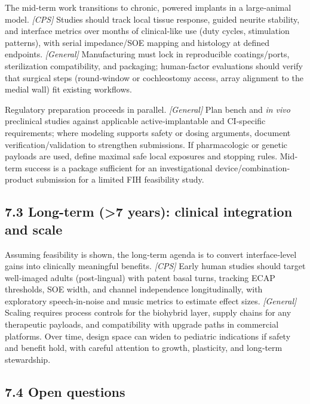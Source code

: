 The mid‐term work transitions to chronic, powered implants in a large‐animal model. \textit{[CPS]} Studies should track local tissue response, guided neurite stability, and interface metrics over months of clinical‐like use (duty cycles, stimulation patterns), with serial impedance/SOE mapping and histology at defined endpoints.\cite{Dalrymple2020, Horne2023} \textit{[General]} Manufacturing must lock in reproducible coatings/ports, sterilization compatibility, and packaging; human‐factor evaluations should verify that surgical steps (round‐window or cochleostomy access, array alignment to the medial wall) fit existing workflows.\cite{Rebscher2008} 

Regulatory preparation proceeds in parallel. \textit{[General]} Plan bench and \emph{in vivo} preclinical studies against applicable active‐implantable and CI‐specific requirements;\cite{ISO14708} where modeling supports safety or dosing arguments, document verification/validation to strengthen submissions.\cite{USFDA2021InSilico} If pharmacologic or genetic payloads are used, define maximal safe local exposures and stopping rules. Mid‐term success is a package sufficient for an investigational device/combination‐product submission for a limited FIH feasibility study.

\subsection*{7.3 Long-term (>7 years): clinical integration and scale}

Assuming feasibility is shown, the long‐term agenda is to convert interface‐level gains into clinically meaningful benefits. \textit{[CPS]} Early human studies should target well‐imaged adults (post‐lingual) with patent basal turns, tracking ECAP thresholds, SOE width, and channel independence longitudinally, with exploratory speech‐in‐noise and music metrics to estimate effect sizes.\cite{wilson2008, wilson2014} \textit{[General]} Scaling requires process controls for the biohybrid layer, supply chains for any therapeutic payloads, and compatibility with upgrade paths in commercial platforms. Over time, design space can widen to pediatric indications if safety and benefit hold, with careful attention to growth, plasticity, and long‐term stewardship.

\subsection*{7.4 Open questions}

